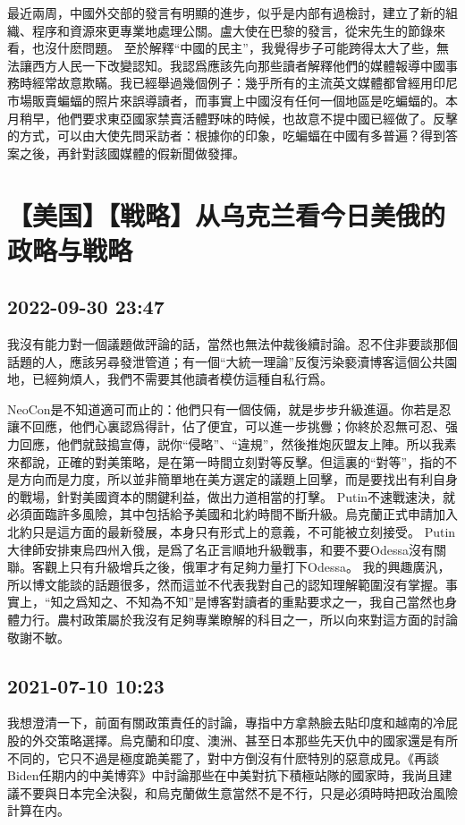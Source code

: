 \documentclass[twocolumn]{ctexart}
\begin{document}
最近兩周，中國外交部的發言有明顯的進步，似乎是内部有過檢討，建立了新的組織、程序和資源來更專業地處理公關。盧大使在巴黎的發言，從宋先生的節錄來看，也沒什麽問題。
至於解釋“中國的民主”，我覺得步子可能跨得太大了些，無法讓西方人民一下改變認知。我認爲應該先向那些讀者解釋他們的媒體報導中國事務時經常故意欺瞞。我已經舉過幾個例子：幾乎所有的主流英文媒體都曾經用印尼市場販賣蝙蝠的照片來誤導讀者，而事實上中國沒有任何一個地區是吃蝙蝠的。本月稍早，他們要求東亞國家禁賣活體野味的時候，也故意不提中國已經做了。反擊的方式，可以由大使先問采訪者：根據你的印象，吃蝙蝠在中國有多普遍？得到答案之後，再針對該國媒體的假新聞做發揮。
\section*{【美国】【戦略】从乌克兰看今日美俄的政略与戦略}
\subsection*{2022-09-30 23:47}

我沒有能力對一個議題做評論的話，當然也無法仲裁後續討論。忍不住非要談那個話題的人，應該另尋發泄管道；有一個“大統一理論”反復污染褻瀆博客這個公共園地，已經夠煩人，我們不需要其他讀者模仿這種自私行爲。

NeoCon是不知道適可而止的：他們只有一個伎倆，就是步步升級進逼。你若是忍讓不回應，他們心裏認爲得計，佔了便宜，可以進一步挑釁；你終於忍無可忍、强力回應，他們就鼓搗宣傳，説你“侵略”、“違規”，然後推炮灰盟友上陣。所以我素來都說，正確的對美策略，是在第一時間立刻對等反擊。但這裏的“對等”，指的不是方向而是力度，所以並非簡單地在美方選定的議題上回擊，而是要找出有利自身的戰場，針對美國資本的關鍵利益，做出力道相當的打擊。
Putin不速戰速決，就必須面臨許多風險，其中包括給予美國和北約時間不斷升級。烏克蘭正式申請加入北約只是這方面的最新發展，本身只有形式上的意義，不可能被立刻接受。
Putin大律師安排東烏四州入俄，是爲了名正言順地升級戰事，和要不要Odessa沒有關聯。客觀上只有升級增兵之後，俄軍才有足夠力量打下Odessa。
我的興趣廣汎，所以博文能談的話題很多，然而這並不代表我對自己的認知理解範圍沒有掌握。事實上，“知之爲知之、不知為不知”是博客對讀者的重點要求之一，我自己當然也身體力行。農村政策屬於我沒有足夠專業瞭解的科目之一，所以向來對這方面的討論敬謝不敏。
\subsection*{2021-07-10 10:23}

我想澄清一下，前面有關政策責任的討論，專指中方拿熱臉去貼印度和越南的冷屁股的外交策略選擇。烏克蘭和印度、澳洲、甚至日本那些先天仇中的國家還是有所不同的，它只不過是極度跪美罷了，對中方倒沒有什麽特別的惡意成見。《再談Biden任期内的中美博弈》中討論那些在中美對抗下積極站隊的國家時，我尚且建議不要與日本完全決裂，和烏克蘭做生意當然不是不行，只是必須時時把政治風險計算在内。
\end{document}
